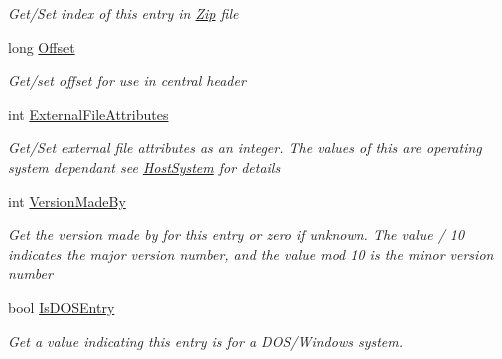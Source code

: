 \begin{DoxyCompactItemize}
\begin{DoxyCompactList}\small\item\em Get/\+Set index of this entry in \hyperlink{namespace_i_c_sharp_code_1_1_sharp_zip_lib_1_1_zip}{Zip} file \end{DoxyCompactList}\item 
long \hyperlink{class_i_c_sharp_code_1_1_sharp_zip_lib_1_1_zip_1_1_zip_entry_aa894f4cc56f28830e656744343a669dc}{Offset}
\begin{DoxyCompactList}\small\item\em Get/set offset for use in central header \end{DoxyCompactList}\item 
int \hyperlink{class_i_c_sharp_code_1_1_sharp_zip_lib_1_1_zip_1_1_zip_entry_a1e5dfa12a33a3b0a14dad39e7ec7d2cc}{External\+File\+Attributes}
\begin{DoxyCompactList}\small\item\em Get/\+Set external file attributes as an integer. The values of this are operating system dependant see \hyperlink{class_i_c_sharp_code_1_1_sharp_zip_lib_1_1_zip_1_1_zip_entry_a7fd80df84f1d8f6e8184816de2a5ebe2}{Host\+System} for details \end{DoxyCompactList}\item 
int \hyperlink{class_i_c_sharp_code_1_1_sharp_zip_lib_1_1_zip_1_1_zip_entry_aa21e51486a25ad4d1c491ebfa44b4fb1}{Version\+Made\+By}
\begin{DoxyCompactList}\small\item\em Get the version made by for this entry or zero if unknown. The value / 10 indicates the major version number, and the value mod 10 is the minor version number \end{DoxyCompactList}\item 
bool \hyperlink{class_i_c_sharp_code_1_1_sharp_zip_lib_1_1_zip_1_1_zip_entry_ab2dec1b6ce0357d6674ac9a62a4d050c}{Is\+D\+O\+S\+Entry}
\begin{DoxyCompactList}\small\item\em Get a value indicating this entry is for a D\+O\+S/\+Windows system. \end{DoxyCompactList}\item 

\end{DoxyCompactItemize}
